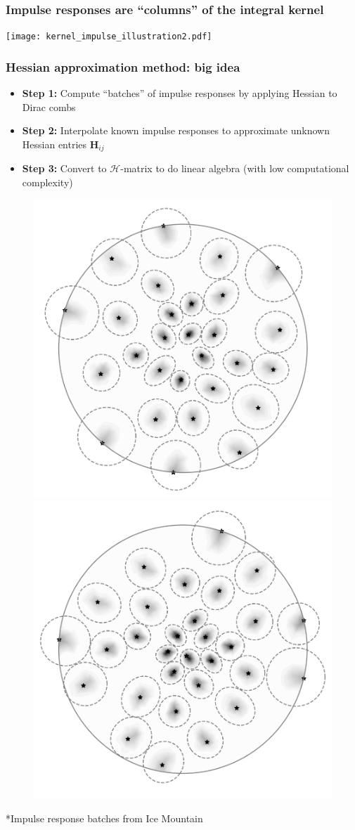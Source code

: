 \documentclass[10pt,final,xcolor=dvipsnames,aspect ratio=169]{beamer}
\begin{document}
\begin{frame}
	\frametitle{Impulse responses are ``columns'' of the integral kernel}
	\begin{center}
		
		\texttt{[image: kernel\_impulse\_illustration2.pdf]}
		
	\end{center}
\end{frame}



\begin{frame}[t]
	\frametitle{Hessian approximation method: big idea}
	\begin{itemize}
		\item {\bf Step 1:} Compute ``batches'' of impulse responses by applying Hessian to Dirac combs
		\item {\bf Step 2:} Interpolate known impulse responses to approximate unknown Hessian entries $\mathbf{H}_{ij}$
		\item {\bf Step 3:} Convert to $\mathcal{H}$-matrix to do linear algebra (with low computational complexity)
	\end{itemize}
    \begin{figure} 
	\includegraphics[width=0.375\columnwidth]{impulse_batch1.png} \hfil  
	\includegraphics[width=0.375\columnwidth]{impulse_batch2.png}
	\end{figure} 
	*Impulse response batches from Ice Mountain
\end{frame}
\end{document}
